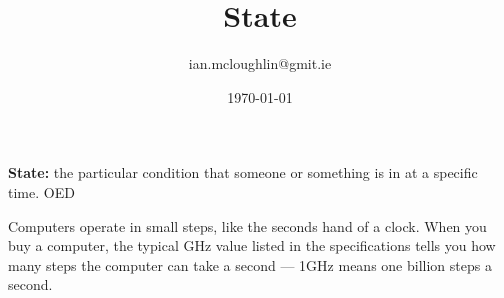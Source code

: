 \documentclass{notes}
\title{State}
\author{ian.mcloughlin@gmit.ie}
\date{\today}
\begin{document}
  

  

  \textbf{State:} the particular condition that someone or something is in at a specific time. OED

  Computers operate in small steps, like the seconds hand of a clock.
  When you buy a computer, the typical GHz value listed in the specifications tells you how many steps the computer can take a second --- 1GHz means one billion steps a second.

  
\end{document}
